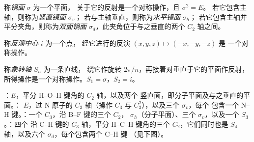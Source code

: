 \begin{definition}[镜面]\label{def:b3:point-groups:mirror}
称\emph{镜面} $\sigma$ 为一个平面，
关于它的反射是一个对称操作，且 $\sigma^2 = E$。
若它包含主轴，则称为\emph{竖直镜面} $\sigma_v$；
若与主轴垂直，则称为\emph{水平镜面}
$\sigma_h$；
若它包含主轴并平分夹角，则称为\emph{双面镜面}
$\sigma_d$，此夹角位于与之垂直的两个
$C_2$ 轴之间。
\end{definition}

\begin{definition}[反演中心]\label{def:b3:point-groups:inversion}
称\emph{反演中心} $i$ 为一个点，
经它进行的反演 $(x, y, z) \mapsto (-x, -y, -z)$ 是
一个对称操作。
\end{definition}

\begin{definition}[象转轴]\label{def:b3:point-groups:improper}
称\emph{象转轴} $S_n$ 为一条直线，
绕它作旋转 $2\pi/n$，再接着对垂直于它的平面作反射，
所得操作是一个对称操作。$S_1 = \sigma$，$S_2 = i$。
\end{definition}

\begin{example}[四种分子的对称元素]\label{ex:b3:point-groups:elements}
：$E$，平分 H--O--H 键角的 $C_2$ 轴，以及两个
竖直面，即分子平面及与之垂直的平面。：
$E$，过 N 原子的 $C_3$ 轴（操作 $C_3$ 与 $C_3^2$），以及三个 $\sigma_v$，每个
包含一个 N--H 键。：一个 $C_3$，沿 B--F 键的三个 $C_2$，
$\sigma_h$（分子平面）、三个 $\sigma_v$，以及一个 $S_3$。：四个
沿 C--H 键的 $C_3$ 轴，平分 H--C--H 键角的三个 $C_2$，它们同时也是
$S_4$ 轴，以及六个 $\sigma_d$，每个包含两个 C--H 键
（见下图）。
\end{example}

